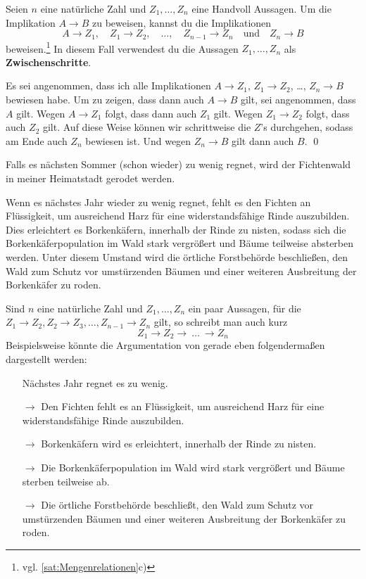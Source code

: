 \begin{sat} \label{zwischenschritt}
 Seien $n$ eine natürliche Zahl und $Z_1,\dots , Z_n$ eine Handvoll Aussagen. Um die Implikation $A\to B$ zu beweisen, kannst du die Implikationen
 \[ A\to Z_1,\quad Z_1\to Z_2,\quad \dots ,\quad Z_{n-1}\to Z_n\quad \text{und}\quad Z_n\to B \]
 beweisen.\footnote{vgl. \cref{sat:Mengenrelationen}c)} In diesem Fall verwendest du die Aussagen $Z_1,\dots , Z_n$ als \textbf{Zwischenschritte}.
\end{sat}
\begin{bew}
Es sei angenommen, dass ich alle Implikationen $A\to Z_1$, $Z_1\to Z_2$, \dots , $Z_n\to B$ bewiesen habe. Um zu zeigen, dass dann auch $A\to B$ gilt, sei angenommen, dass $A$ gilt. Wegen $A\to Z_1$ folgt, dass dann auch $Z_1$ gilt. Wegen $Z_1\to Z_2$ folgt, dass auch $Z_2$ gilt. Auf diese Weise können wir schrittweise die $Z$'s durchgehen, sodass am Ende auch $Z_n$ bewiesen ist. Und wegen $Z_n\to B$ gilt dann auch $B$. \qed
\end{bew}



    \begin{bsp}
  Falls es nächsten Sommer (schon wieder) zu wenig regnet, wird der Fichtenwald in meiner Heimatstadt gerodet werden.
  \end{bsp}
  \begin{bew}
Wenn es nächstes Jahr wieder zu wenig regnet, fehlt es den Fichten an Flüssigkeit, um ausreichend Harz für eine widerstandsfähige Rinde auszubilden. Dies erleichtert es Borkenkäfern, innerhalb der Rinde zu nisten, sodass sich die Borkenkäferpopulation im Wald stark vergrößert und Bäume teilweise absterben werden. Unter diesem Umstand wird die örtliche Forstbehörde beschließen, den Wald zum Schutz vor umstürzenden Bäumen und einer weiteren Ausbreitung der Borkenkäfer zu roden.   
  \end{bew}

  
  \begin{bem}[*]
   Sind $n$ eine natürliche Zahl und $Z_1,\dots , Z_n$ ein paar Aussagen, für die $Z_1\to Z_2, Z_2\to Z_3, \dots, Z_{n-1}\to Z_n$ gilt, so schreibt man auch kurz
   \[ Z_1\to Z_2\to\ \dots\ \to Z_n\]
   Beispielsweise könnte die Argumentation von gerade eben folgendermaßen dargestellt werden:
   \begin{itemize}
    \item[] Nächstes Jahr regnet es zu wenig.
    \item[$\to$] Den Fichten fehlt es an Flüssigkeit, um ausreichend Harz für eine widerstandsfähige Rinde auszubilden.
    \item[$\to$] Borkenkäfern wird es erleichtert, innerhalb der Rinde zu nisten.
    \item[$\to$] Die Borkenkäferpopulation im Wald wird stark vergrößert und Bäume sterben teilweise ab.
    \item[$\to$] Die örtliche Forstbehörde beschließt, den Wald zum Schutz vor umstürzenden Bäumen und einer weiteren Ausbreitung der Borkenkäfer zu roden.   
   \end{itemize}
  \end{bem}

